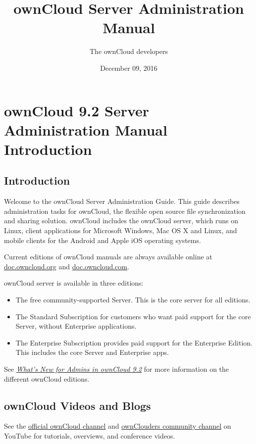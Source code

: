 \documentclass[letterpaper,10pt,english]{sphinxmanual}
\title{ownCloud Server Administration Manual}
\date{December 09, 2016}
\author{The ownCloud developers}
\begin{document}
\maketitle
\tableofcontents
{}\label{contents::doc}



\chapter{ownCloud 9.2 Server Administration Manual Introduction}
\label{index::doc}\label{index:table-of-contents}\label{index:owncloud-version-server-administration-manual-introduction}

\section{Introduction}
\label{index:introduction}
Welcome to the ownCloud Server Administration Guide. This guide describes
administration tasks for ownCloud, the flexible open source file synchronization
and sharing solution. ownCloud includes the ownCloud server, which runs on
Linux, client applications for Microsoft Windows, Mac OS X and Linux, and mobile
clients for the Android and Apple iOS operating systems.

Current editions of ownCloud manuals are always available online at
\href{https://doc.owncloud.org/}{doc.owncloud.org} and \href{https://doc.owncloud.com/}{doc.owncloud.com}.

ownCloud server is available in three editions:
\begin{itemize}
\item {} 
The free community-supported Server. This is the core server for all editions.

\item {} 
The Standard Subscription for customers who want paid support for the core
Server, without Enterprise applications.

\item {} 
The Enterprise Subscription provides paid support for the Enterprise Edition.
This includes the core Server and Enterprise apps.

\end{itemize}

See {\hyperref[whats_new_admin::doc]{\emph{What's New for Admins in ownCloud 9.2}}} for more information on the different ownCloud
editions.


\section{ownCloud Videos and Blogs}
\label{index:owncloud-videos-and-blogs}
See the \href{https://www.youtube.com/channel/UC\_4gez4lsWqciH-otOlXo5w}{official ownCloud channel} and \href{https://www.youtube.com/channel/UCA8Ehsdu3KaxSz5KOcCgHbw}{ownClouders
community channel}
on YouTube for tutorials, overviews, and conference videos.
\end{document}
